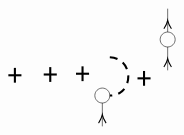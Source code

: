 \begin{equation}
\begin{tikzpicture}[x=0.55pt,y=0.55pt,yscale=-1,xscale=1]
\draw   (257.75,119.08) .. controls (257.75,113.74) and (262.12,109.4) .. (267.5,109.4) .. controls (272.88,109.4) and (277.25,113.74) .. (277.25,119.08) .. controls (277.25,124.43) and (272.88,128.77) .. (267.5,128.77) .. controls (262.12,128.77) and (257.75,124.43) .. (257.75,119.08) -- cycle ;
\draw    (267.5,159.08) -- (267.5,128.77) ;
\draw [shift={(267.5,143.93)}, rotate = 450] [color={rgb, 255:red, 0; green, 0; blue, 0 }  ][line width=0.75]    (10.93,-4.9) .. controls (6.95,-2.3) and (3.31,-0.67) .. (0,0) .. controls (3.31,0.67) and (6.95,2.3) .. (10.93,4.9)   ;
\draw [line width=1.5]    (145.25,92.8) -- (162.25,92.8) ;
\draw [line width=1.5]    (153.75,102.4) -- (153.75,83.21) ;

\draw [line width=1.5]    (191.25,91.8) -- (208.25,91.8) ;
\draw [line width=1.5]    (199.75,101.4) -- (199.75,82.21) ;

\draw [line width=1.5]    (233.25,90.8) -- (250.25,90.8) ;
\draw [line width=1.5]    (241.75,100.4) -- (241.75,81.21) ;

\draw [line width=1.5]  [dash pattern={on 5.63pt off 4.5pt}]  (277.25,69.4) .. controls (310.25,71.4) and (308.25,119.4) .. (277.25,119.08) ;
\draw [line width=1.5]    (313.25,96.8) -- (330.25,96.8) ;
\draw [line width=1.5]    (321.75,106.4) -- (321.75,87.21) ;

\draw    (352.5,36.72) -- (352.5,6.4) ;
\draw [shift={(352.5,21.56)}, rotate = 450] [color={rgb, 255:red, 0; green, 0; blue, 0 }  ][line width=0.75]    (10.93,-4.9) .. controls (6.95,-2.3) and (3.31,-0.67) .. (0,0) .. controls (3.31,0.67) and (6.95,2.3) .. (10.93,4.9)   ;
\draw   (342.75,46.4) .. controls (342.75,41.05) and (347.12,36.72) .. (352.5,36.72) .. controls (357.88,36.72) and (362.25,41.05) .. (362.25,46.4) .. controls (362.25,51.75) and (357.88,56.08) .. (352.5,56.08) .. controls (347.12,56.08) and (342.75,51.75) .. (342.75,46.4) -- cycle ;
\draw    (352.5,86.4) -- (352.5,56.08) ;
\draw [shift={(352.5,71.24)}, rotate = 450] [color={rgb, 255:red, 0; green, 0; blue, 0 }  ][line width=0.75]    (10.93,-4.9) .. controls (6.95,-2.3) and (3.31,-0.67) .. (0,0) .. controls (3.31,0.67) and (6.95,2.3) .. (10.93,4.9)   ;


\end{tikzpicture}
\end{equation}
